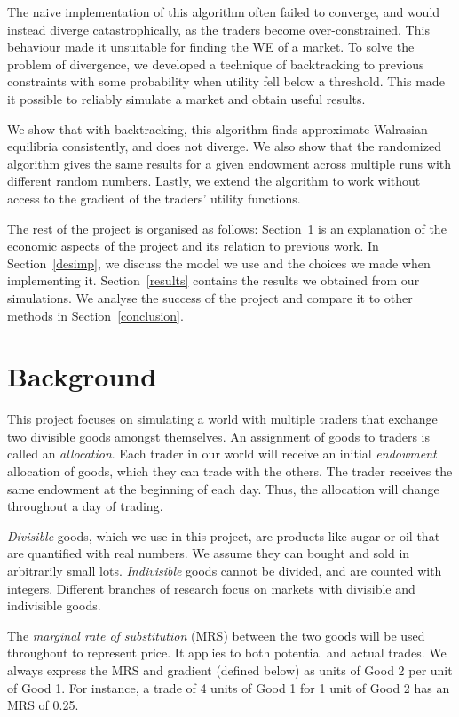 \documentclass[12pt,a4paper,titlepage]{article}
\begin{document}
The naive implementation of this algorithm often failed to converge, and would instead diverge catastrophically, as the traders become over-constrained.
This behaviour made it unsuitable for finding the WE of a market.
To solve the problem of divergence, we developed a technique of backtracking to previous constraints with some probability when utility fell below a threshold.
This made it possible to reliably simulate a market and obtain useful results.

We show that with backtracking, this algorithm finds approximate Walrasian equilibria consistently, and does not diverge.
We also show that the randomized algorithm gives the same results for a given endowment across multiple runs with different random numbers.
Lastly, we extend the algorithm to work without access to the gradient of the traders' utility functions.

The rest of the project is organised as follows:
Section~\ref{background} is an explanation of the economic aspects of the project and its relation to previous work.
In Section~\ref{desimp}, we discuss the model we use and the choices we made when implementing it.
Section~\ref{results} contains the results we obtained from our simulations.
We analyse the success of the project and compare it to other methods in Section~\ref{conclusion}. 

\clearpage

\section{Background}\label{background}

This project focuses on simulating a world with multiple traders that exchange two divisible goods amongst themselves.
An assignment of goods to traders is called an \textit{allocation}.
Each trader in our world will receive an initial \textit{endowment} allocation of goods, which they can trade with the others.
The trader receives the same endowment at the beginning of each day.
Thus, the allocation will change throughout a day of trading.

\textit{Divisible} goods, which we use in this project, are products like sugar or oil that are quantified with real numbers.
We assume they can bought and sold in arbitrarily small lots.
\textit{Indivisible} goods cannot be divided, and are counted with integers.
Different branches of research focus on markets with divisible and indivisible goods.

The \textit{marginal rate of substitution} (MRS) between the two goods will be used throughout to represent price.
It applies to both potential and actual trades.
We always express the MRS and gradient (defined below) as units of Good 2 per unit of Good 1.
For instance, a trade of 4 units of Good 1 for 1 unit of Good 2 has an MRS of 0.25.
\end{document}
